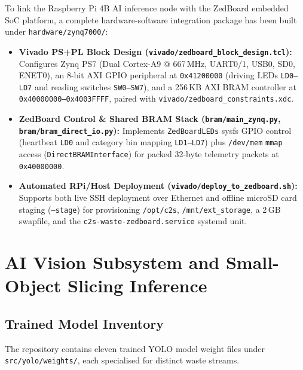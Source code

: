 \documentclass[12pt,a4paper]{article}
\begin{document}
To link the Raspberry Pi 4B AI inference node with the ZedBoard embedded SoC platform,
a complete hardware-software integration package has been built under
\texttt{hardware/zynq7000/}:
\begin{itemize}
  \item \textbf{Vivado PS+PL Block Design (\texttt{vivado/zedboard\_block\_design.tcl}):}
  Configures Zynq PS7 (Dual Cortex-A9 @ 667\,MHz, UART0/1, USB0, SD0, ENET0), an
  8-bit AXI GPIO peripheral at \texttt{0x41200000} (driving LEDs \texttt{LD0--LD7} and
  reading switches \texttt{SW0--SW7}), and a 256\,KB AXI BRAM controller at
  \texttt{0x40000000--0x4003FFFF}, paired with \texttt{vivado/zedboard\_constraints.xdc}.
  \item \textbf{ZedBoard Control \& Shared BRAM Stack (\texttt{bram/main\_zynq.py}, \texttt{bram/bram\_direct\_io.py}):}
  Implements \texttt{ZedBoardLEDs} sysfs GPIO control (heartbeat \texttt{LD0} and
  category bin mapping \texttt{LD1--LD7}) plus \texttt{/dev/mem} \texttt{mmap} access
  (\texttt{DirectBRAMInterface}) for packed 32-byte telemetry packets at \texttt{0x40000000}.
  \item \textbf{Automated RPi/Host Deployment (\texttt{vivado/deploy\_to\_zedboard.sh}):}
  Supports both live SSH deployment over Ethernet and offline microSD card staging
  (\texttt{--stage}) for provisioning \texttt{/opt/c2s}, \texttt{/mnt/ext\_storage},
  a 2\,GB swapfile, and the \texttt{c2s-waste-zedboard.service} systemd unit.
\end{itemize}

\clearpage

\section{AI Vision Subsystem and Small-Object Slicing Inference}

\subsection{Trained Model Inventory}

The repository contains eleven trained YOLO model weight files under
\texttt{src/yolo/weights/}, each specialised for distinct waste streams.
\end{document}
